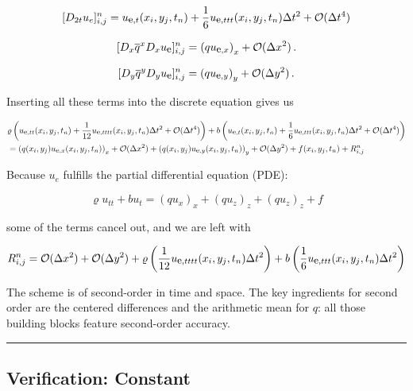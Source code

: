 \documentclass[letterpaper,10pt,english]{/usr/share/sphinx/texinputs/sphinxhowto}
\begin{document}
\[
\lbrack D_{2t}u_e \rbrack^n_{i,j} = u_{\small\mbox{e}, t}(x_i,y_j,t_n) 
+\frac{1}{6}u_{\small\mbox{e}, ttt}(x_i,y_j,t_n) \Delta t^2 + {\mathcal{O}(\Delta t^4)}
\]

\[ 
\lbrack D_x \overline{q}^{x}D_x {u_{\small\mbox{e}}} \rbrack^n_{i,j} 
=\left(q{u_{\small\mbox{e}, x}}\right)_{x} +
{\mathcal{O}(\Delta x^2)}{\thinspace .}
\]

\[ 
\lbrack D_y \overline{q}^{y}D_y {u_{\small\mbox{e}}} \rbrack^n_{i,j} 
=\left(q{u_{\small\mbox{e}, y}}\right)_{y} +
{\mathcal{O}(\Delta y^2)}{\thinspace .}
\]

Inserting all these terms into the discrete equation gives us

\begin{align*}
&\varrho\left({u_{\small\mbox{e}, tt}}(x_i,y_j,t_n) +
\frac{1}{12}{u_{\small\mbox{e}, tttt}}(x_i,y_j,t_n)\Delta t^2 + {\mathcal{O}(\Delta t^4)}
\right)
+ b \left(u_{\small\mbox{e}, t}(x_i,y_j,t_n) +\frac{1}{6}u_{\small\mbox{e}, ttt}(x_i,y_j,t_n) \Delta t^2 + {\mathcal{O}(\Delta t^4)} \right) \\
&= \left(q(x_i,y_j){u_{\small\mbox{e}, x}}(x_i,y_j,t_n)\right)_{x} +{\mathcal{O}(\Delta x^2)} 
+ \left(q(x_i,y_j){u_{\small\mbox{e}, y}}(x_i,y_j,t_n)\right)_{y} + {\mathcal{O}(\Delta y^2)}
+f(x_i,y_j,t_n)+R^n_{i,j}
\end{align*}

Because $u_e$ fulfills the partial differential equation (PDE):

\[
\varrho u_{tt} + b u_{t}= (q u_x)_x + (q u_z)_z + (q u_z)_z + f
\]

some of the terms cancel out, and we are left with

\begin{align*}
R^n_{i,j} = {\mathcal{O}(\Delta x^2)} + {\mathcal{O}(\Delta y^2)}+\varrho\left(\frac{1}{12}{u_{\small\mbox{e}, tttt}}(x_i,y_j,t_n)\Delta t^2 \right)
+ b \left(\frac{1}{6}u_{\small\mbox{e}, ttt}(x_i,y_j,t_n) \Delta t^2 
\right) 
\end{align*}

The scheme is of second-order in time and space. The key ingredients for
second order are the centered differences and the arithmetic mean for
$q$: all those building blocks feature second-order accuracy.\begin{center}\rule{3in}{0.4pt}\end{center}

\subsection{Verification: Constant}
\end{document}
